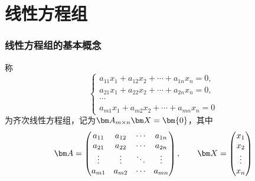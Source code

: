 \part{线性方程组}
\section{线性方程组的基本概念}
称
\[
    \begin{cases}
        a_{11}x_1 + a_{12}x_2 + \cdots + a_{1n}x_n = 0, \\
        a_{21}x_1 + a_{22}x_2 + \cdots + a_{2n}x_n = 0, \\
        \cdots                                          \\
        a_{m1}x_1 + a_{m2}x_2 + \cdots + a_{mn}x_n = 0
    \end{cases}
\]
为齐次线性方程组，记为$\mat{A}_{m\times n}\mat{X}=\bm{0}$，其中
\[
    \mat{A} =
    \begin{pmatrix}
        a_{11} & a_{12} & \cdots & a_{1n} \\
        a_{21} & a_{22} & \cdots & a_{2n} \\
        \vdots & \vdots & \ddots & \vdots \\
        a_{m1} & a_{m2} & \cdots & a_{mn}
    \end{pmatrix},
    \qquad
    \mat{X}=
    \begin{pmatrix}
        x_1 \\x_2\\\vdots\\x_n
    \end{pmatrix}
\]

